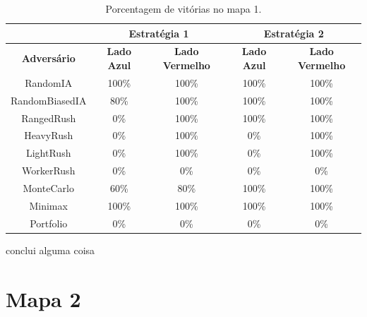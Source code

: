 \begin{table}[ht]
	\centering
	\caption{Porcentagem de vitórias no mapa 1.}
	\label{tab:mapa1}
	\begin{tabular}{|c|cc|cc|}
		\hline
		\textbf{}           & \multicolumn{2}{c|}{\textbf{Estratégia 1}}  & \multicolumn{2}{c|}{\textbf{Estratégia 2}}  \\ \hline
		\textbf{Adversário} & \textbf{Lado Azul} & \textbf{Lado Vermelho} & \textbf{Lado Azul} & \textbf{Lado Vermelho} \\ \hline
		RandomIA            & 100\%              & 100\%                  & 100\%              & 100\%                  \\ \hline
		RandomBiasedIA      & 80\%               & 100\%                  & 100\%              & 100\%                  \\ \hline
		RangedRush          & 0\%                & 100\%                  & 100\%              & 100\%                  \\ \hline
		HeavyRush           & 0\%                & 100\%                  & 0\%                & 100\%                  \\ \hline
		LightRush           & 0\%                & 100\%                  & 0\%                & 100\%                  \\ \hline
		WorkerRush          & 0\%                & 0\%                    & 0\%                & 0\%                    \\ \hline
		MonteCarlo          & 60\%               & 80\%                   & 100\%              & 100\%                  \\ \hline
		Minimax             & 100\%              & 100\%                  & 100\%              & 100\%                  \\ \hline
		Portfolio           & 0\%                & 0\%                    & 0\%                & 0\%                    \\ \hline
	\end{tabular}
\end{table}

conclui alguma coisa

\section{Mapa 2}


